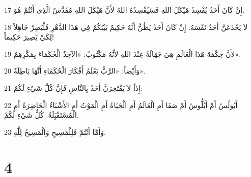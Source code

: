 \par 17 إِنْ كَانَ أَحَدٌ يُفْسِدُ هَيْكَلَ اللهِ فَسَيُفْسِدُهُ اللهُ لأَنَّ هَيْكَلَ اللهِ مُقَدَّسٌ الَّذِي أَنْتُمْ هُوَ.
\par 18 لاَ يَخْدَعَنَّ أَحَدٌ نَفْسَهُ. إِنْ كَانَ أَحَدٌ يَظُنُّ أَنَّهُ حَكِيمٌ بَيْنَكُمْ فِي هَذَا الدَّهْرِ فَلْيَصِرْ جَاهِلاً لِكَيْ يَصِيرَ حَكِيماً!
\par 19 لأَنَّ حِكْمَةَ هَذَا الْعَالَمِ هِيَ جَهَالَةٌ عِنْدَ اللهِ لأَنَّهُ مَكْتُوبٌ: «الآخِذُ الْحُكَمَاءَ بِمَكْرِهِمْ».
\par 20 وَأَيْضاً: «الرَّبُّ يَعْلَمُ أَفْكَارَ الْحُكَمَاءِ أَنَّهَا بَاطِلَةٌ».
\par 21 إِذاً لاَ يَفْتَخِرَنَّ أَحَدٌ بِالنَّاسِ فَإِنَّ كُلَّ شَيْءٍ لَكُمْ:
\par 22 أَبُولُسُ أَمْ أَبُلُّوسُ أَمْ صَفَا أَمِ الْعَالَمُ أَمِ الْحَيَاةُ أَمِ الْمَوْتُ أَمِ الأَشْيَاءُ الْحَاضِرَةُ أَمِ الْمُسْتَقْبَِلَةُ. كُلُّ شَيْءٍ لَكُمْ.
\par 23 وَأَمَّا أَنْتُمْ فَلِلْمَسِيحِ وَالْمَسِيحُ لِلَّهِ.

\chapter{4}

